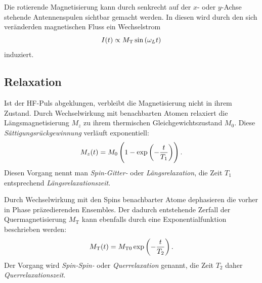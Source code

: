 \documentclass[
    11pt,
    ngerman
]{scrbook}
\begin{document}
Die rotierende Magnetisierung kann durch senkrecht auf der $x$- oder $y$-Achse stehende Antennenspulen sichtbar gemacht werden. In diesen wird durch den sich veränderden magnetischen Fluss ein Wechselstrom
\[
    I(t) \propto M_\text{T} \sin\left({\omega_L t}\right)
\]
induziert.





\subsection{Relaxation}

Ist der HF-Puls abgeklungen, verbleibt die Magnetisierung nicht in ihrem
Zustand. Durch Wechselwirkung mit benachbarten Atomen relaxiert die Längsmagnetisierung $M_z$ zu ihrem
thermischen Gleichgewichtszustand $M_0$. Diese \emph{Sättigungsrückgewinnung} verläuft exponentiell:
\[
    M_z(t) = M_0\del{1-\dexp{-\frac{t}{T_1}}}.
\]
Diesen Vorgang nennt man \emph{Spin-Gitter-} oder \emph{Längsrelaxation}, die
Zeit $T_1$ entsprechend \emph{Längsrelaxationszeit}.

Durch Wechselwirkung mit den Spins benachbarter Atome dephasieren die vorher in
Phase präzedierenden Ensembles. Der dadurch entstehende Zerfall der
Quermagnetisierung $M_\text{T}$ kann ebenfalls durch eine Exponentialfunktion
beschrieben werden:
\[
    M_\text{T}(t) = M_{\text{T}0}\exp\left({-\frac{t}{T_2}}\right).
\]
Der Vorgang wird \emph{Spin-Spin-} oder \emph{Querrelaxation} genannt, die Zeit $T_2$ daher \emph{Querrelaxationszeit}. 
\end{document}
